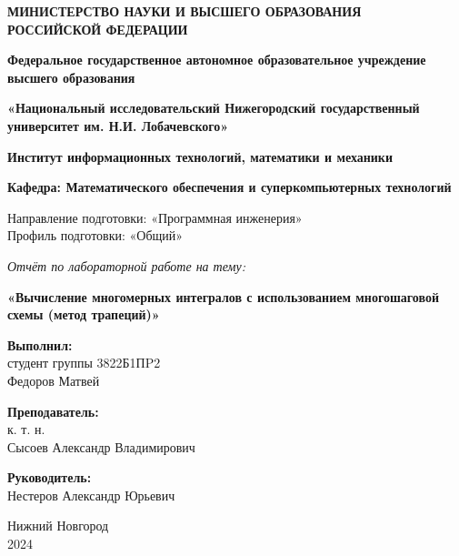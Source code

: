 \documentclass{article}
\begin{document}
\begin{center}
    \textbf{МИНИСТЕРСТВО НАУКИ И ВЫСШЕГО ОБРАЗОВАНИЯ} \\
    \textbf{РОССИЙСКОЙ ФЕДЕРАЦИИ} \\
    \vspace{0.5cm}
    
    \textbf{Федеральное государственное автономное образовательное учреждение} \\
    \textbf{высшего образования} \\
    \vspace{0.5cm}
    
    \textbf{«Национальный исследовательский Нижегородский государственный} \\
    \textbf{университет им. Н.И. Лобачевского»} \\
    \vspace{0.5cm}
    
    \textbf{Институт информационных технологий, математики и механики} \\
    \vspace{0.5cm}
    
    \textbf{Кафедра: Математического обеспечения и суперкомпьютерных технологий} \\
    \vspace{1cm}
    
    Направление подготовки: «Программная инженерия» \\
    Профиль подготовки: «Общий» \\
    \vspace{1cm}
    
    \textit{Отчёт по лабораторной работе на тему:} \\
    \vspace{0.5cm}
    
    \Large\textbf{«Вычисление многомерных интегралов с использованием многошаговой схемы (метод трапеций)»} \\
    \vspace{3.5cm}

    \begin{flushright}
        \textbf{Выполнил:} \\
        студент группы 3822Б1ПP2 \\
        Федоров Матвей \\
        \vspace{1cm}
        
        \textbf{Преподаватель:} \\
         к. т. н. \\
        Сысоев Александр Владимирович \\
        \vspace{0.5cm}
        
        \textbf{Руководитель:} \\
        Нестеров Александр Юрьевич \\
    \end{flushright}
    
    \vfill %
    \small Нижний Новгород \\
    2024
\end{center}
\end{document}
